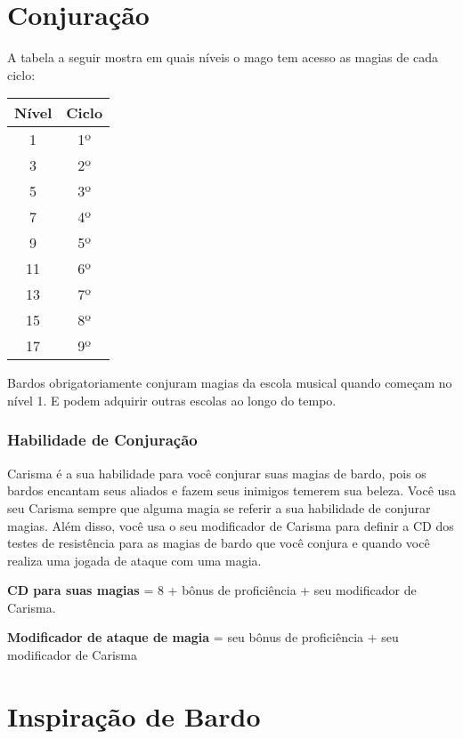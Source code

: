 \documentclass{RPG_Adventure}[2021/10/20]
\begin{document}
\section*{Conjuração}%

A tabela a seguir mostra em quais níveis o mago tem acesso as magias de cada
ciclo:

\begin{center}
\begin{tabular}{|||c||c|||}
    \hline
    \textbf{Nível} & \textbf{Ciclo} \\
    \hline
    1 & 1º \\
    \hline
    3 & 2º \\
    \hline
    5 & 3º \\
    \hline
    7 & 4º \\
    \hline
    9 & 5º \\
    \hline
    11 & 6º \\
    \hline
    13 & 7º \\
    \hline
    15 & 8º \\
    \hline
    17 & 9º \\
    \hline
\end{tabular}
\end{center}

Bardos obrigatoriamente conjuram magias da escola musical quando começam no
nível 1. E podem adquirir outras escolas ao longo do tempo.

\subsubsection*{Habilidade de Conjuração}%

Carisma é a sua habilidade para você conjurar suas magias de bardo, pois os
bardos encantam seus aliados e fazem seus inimigos temerem sua beleza.
Você usa seu Carisma sempre que alguma magia se referir a sua habilidade de
conjurar magias. Além disso, você usa o seu modificador de Carisma para definir
a CD dos testes de resistência para as magias de bardo que você conjura e
quando você realiza uma jogada de ataque com uma magia.

\begin{center}
\textbf{CD para suas magias} = 8 + bônus de proficiência + seu modificador de
Carisma. \nl

\textbf{Modificador de ataque de magia} = seu bônus de proficiência + seu
modificador de Carisma
\end{center}

\section*{Inspiração de Bardo}
\end{document}
